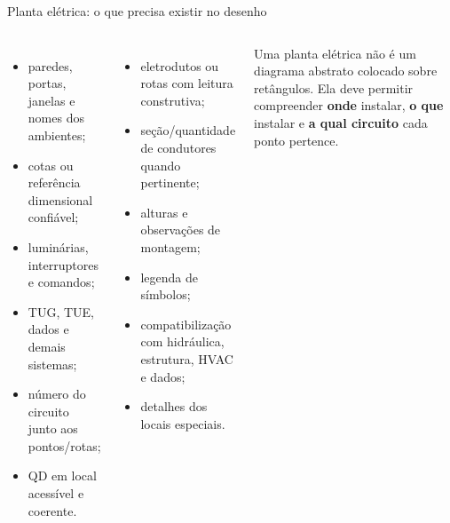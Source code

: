 \begin{frame}[shrink=2]{Planta elétrica: o que precisa existir no desenho}
\small
\begin{columns}[T,onlytextwidth]
\begin{itemize}
\item paredes, portas, janelas e nomes dos ambientes;
\item cotas ou referência dimensional confiável;
\item luminárias, interruptores e comandos;
\item TUG, TUE, dados e demais sistemas;
\item número do circuito junto aos pontos/rotas;
\item QD em local acessível e coerente.
\end{itemize}
\begin{itemize}
\item eletrodutos ou rotas com leitura construtiva;
\item seção/quantidade de condutores quando pertinente;
\item alturas e observações de montagem;
\item legenda de símbolos;
\item compatibilização com hidráulica, estrutura, HVAC e dados;
\item detalhes dos locais especiais.
\end{itemize}
\begin{caixaProjeto}
Uma planta elétrica não é um diagrama abstrato colocado sobre retângulos. Ela deve permitir compreender \textbf{onde} instalar, \textbf{o que} instalar e \textbf{a qual circuito} cada ponto pertence.
\end{caixaProjeto}
\end{columns}
\end{frame}

